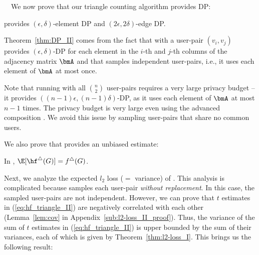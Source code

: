 \smallskip
{}~~We now prove that our triangle counting algorithm \AlgWSTri{} provides DP: 
\begin{theorem}
\label{thm:DP_II}
\AlgWSTri{} provides $(\epsilon, \delta)$-element DP and $(2\epsilon, 2\delta)$-edge DP. 
\end{theorem}
Theorem~\ref{thm:DP_II} comes from the fact that 
\AlgWS{} with a user-pair $(v_i,v_j)$ provides $(\epsilon,\delta)$-DP for each element in the $i$-th and $j$-th columns of the adjacency matrix $\bmA$ and that \AlgWSTri{} samples independent user-pairs, i.e., it uses each element of $\bmA$ at most once. 

Note that running \AlgWS{} with all $\binom{n}{2}$ user-pairs requires a very large privacy budget --  
it provides $((n-1) \epsilon, (n-1) \delta)$-DP, as it uses each element of $\bmA$ at most $n-1$ times. 
The privacy budget is very large even using the advanced composition \cite{DP,Kairouz_ICML15}. 
We avoid this issue by sampling user-pairs that share no common users. 

We also prove that 
\AlgWSTri{} provides an unbiased estimate: 
\begin{theorem}
\label{thm:unbiased_II}
In \AlgWSTri{}, $\E[\hf^\triangle(G)] = f^\triangle(G)$. 
\end{theorem}

Next, we analyze the expected $l_2$ loss ($=$ variance) of \AlgWSTri{}. 
This analysis is complicated because \AlgWSTri{} samples each user-pair \textit{without replacement}. 
In this case, the sampled user-pairs are not independent. 
However, we can prove that 
$t$ estimates in (\ref{eq:hf_triangle_II}) are negatively correlated with each other (Lemma~\ref{lem:cov} in Appendix~\ref{sub:l2-loss_II_proof}). 
Thus, the variance of the sum of $t$ estimates 
in (\ref{eq:hf_triangle_II}) is upper bounded by the sum of their variances, each of which is given by Theorem~\ref{thm:l2-loss_I}. 
This brings us the following result: 

